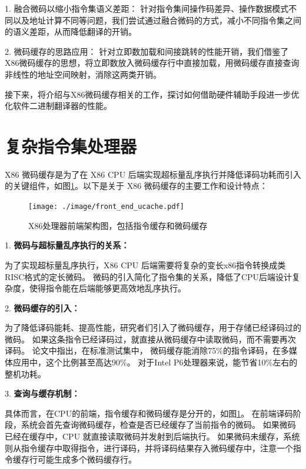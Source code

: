 1. 融合微码以缩小指令集语义差距： 针对指令集间操作码差异、操作数据模式不同以及地址计算不同等问题，我们尝试通过融合微码的方式，减小不同指令集之间的语义差距，从而降低翻译的开销。

2. 微码缓存的思路应用： 针对立即数加载和间接跳转的性能开销，我们借鉴了X86微码缓存的思想，将立即数放入微码缓存行中直接加载，用微码缓存直接查询非线性的地址空间映射，消除这两类开销。

接下来，将介绍与X86微码缓存相关的工作，探讨如何借助硬件辅助手段进一步优化软件二进制翻译器的性能。


\section{复杂指令集处理器}\label{sec:complex_isa}

X86 微码缓存是为了在 X86 CPU 后端实现超标量乱序执行并降低译码功耗而引入的关键组件\cite{solomonMicrooperationCachePower2001}，如图\ref{img:front_end_ucache}。以下是关于 X86 微码缓存的主要工作和设计特点：

\begin{figure}[!htbp]
  \centering
  \texttt{[image: ./image/front\_end\_ucache.pdf]}
  \caption{X86处理器前端架构图，包括指令缓存和微码缓存}
  \label{img:front_end_ucache}
\end{figure}


1. \textbf{微码与超标量乱序执行的关系：}

为了实现超标量乱序执行，X86 CPU 后端需要将复杂的变长x86指令转换成类RISC格式的定长微码。
微码的引入简化了指令集的关系，降低了CPU后端设计复杂度，使得指令能在后端能够更高效地乱序执行。

2. \textbf{微码缓存的引入：}

为了降低译码能耗、提高性能，研究者们引入了微码缓存，用于存储已经译码过的微码。
如果这条指令已经译码过，就直接从微码缓存中读取微码，而不需要再次译码。
\cite{solomonMicrooperationCachePower2001}论文中指出，在标准测试集中，
微码缓存能消除75\%的指令译码，在多媒体应用中，这个比例甚至高达90\%。
对于Intel P6处理器来说，能节省10\%左右的整机功耗。

3. \textbf{查询与缓存机制：}

具体而言，在CPU的前端，指令缓存和微码缓存是分开的，如图\ref{img:front_end_ucache}。
在前端译码阶段，系统会首先查询微码缓存，检查是否已经缓存了当前指令的微码。
如果微码已经在缓存中，CPU 就直接读取微码并发射到后端执行。
如果微码未缓存，系统则从指令缓存中取得指令，进行译码，并将译码结果存入微码缓存中，注意一个指令缓存行可能生成多个微码缓存行。

